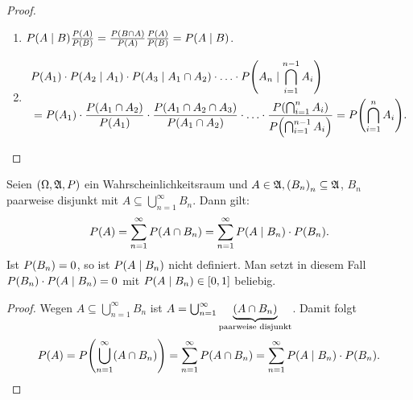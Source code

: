 \documentclass{lecture}
\begin{document}
    \begin{proof}
        \begin{enumerate}
            \item \(P\parentheses*{A \mid B}\frac{P\parentheses*{A}}{P\parentheses*{B}} = \frac{P\parentheses*{B \cap A}}{P\parentheses*{A}}\frac{P\parentheses*{A}}{P\parentheses*{B}} = P\parentheses*{A \mid B}\).
            \item
            \begin{align*}
                &P\parentheses*{A_1} \cdot P\parentheses*{A_2 \mid A_1} \cdot P\parentheses*{A_3 \mid A_1 \cap A_2} \cdot \ldots \cdot P\parentheses*{A_n \mid \bigcap_{i = 1}^{n - 1}A_i}\\
                &= P\parentheses*{A_1} \cdot \frac{P\parentheses*{A_1 \cap A_2}}{P\parentheses*{A_1}} \cdot \frac{P\parentheses*{A_1 \cap A_2 \cap A_3}}{P\parentheses*{A_1 \cap A_2}} \cdot \ldots \cdot \frac{P\parentheses*{\bigcap_{i = 1}^n A_i}}{P\parentheses*{\bigcap_{i = 1}^{n - 1} A_i}} = P\parentheses*{\bigcap_{i = 1}^n A_i}.
            \end{align*}
        \end{enumerate}
    \end{proof}

    \begin{lemma}
        Seien \(\parentheses*{\Omega, \mathfrak{A}, P}\) ein Wahrscheinlichkeitsraum und \(A \in \mathfrak{A}, \parentheses*{B_n}_n \subseteq \mathfrak{A}\), \(B_n\) paarweise disjunkt mit \(A \subseteq \bigcup_{n = 1}^\infty B_n\).
        Dann gilt:
        \[
            P\parentheses*{A} = \sum_{n = 1}^\infty P\parentheses*{A \cap B_n} = \sum_{n = 1}^\infty P\parentheses*{A \mid B_n} \cdot P\parentheses*{B_n}.
        \]
        Ist \(P\parentheses*{B_n} = 0\), so ist \(P\parentheses*{A \mid B_n}\) nicht definiert.
        Man setzt in diesem Fall \(P\parentheses*{B_n} \cdot P\parentheses*{A \mid B_n} = 0\) mit \(P\parentheses*{A \mid B_n} \in \brackets*{0, 1}\) beliebig.
    \end{lemma}

    \begin{proof}
        Wegen \(A \subseteq \bigcup_{n = 1}^\infty B_n\) ist \(A = \bigcup_{n = 1}^\infty \underbrace{\parentheses*{A \cap B_n}}_{\text{paarweise disjunkt}}\).
        Damit folgt
        \[
            P\parentheses*{A} = P\parentheses*{\bigcup_{n = 1}^\infty\parentheses*{A \cap B_n}} = \sum_{n = 1}^\infty P\parentheses*{A \cap B_n} = \sum_{n = 1}^\infty P\parentheses*{A \mid B_n} \cdot P\parentheses*{B_n}.
        \]
    \end{proof}
\end{document}
